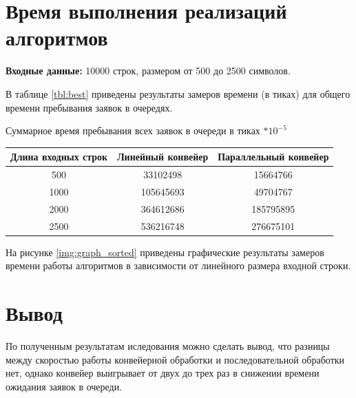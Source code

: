 \section{Время выполнения реализаций алгоритмов}

\textbf{Входные данные:} 10000 строк, размером от 500 до 2500 символов.

В таблице \ref{tbl:best} приведены результаты замеров времени (в тиках) для общего времени пребывания заявок в очередях.

\begin{center}
	\begin{threeparttable}
		\caption{Суммарное время пребывания всех заявок в очереди в тиках $* 10^{-5}$}
		\label{tbl:best}
		\begin{tabular}{|c|c|c|}
			\hline
			Длина входных строк &Линейный конвейер &Параллельный конвейер\\
			\hline
			500 & 33102498& 15664766 \\
			\hline
		    1000& 105645693 &49704767 \\
		    \hline
		    2000&364612686 & 185795895\\
			\hline
		    2500 & 536216748&276675101 \\
			\hline
		\end{tabular}
		
	\end{threeparttable}
\end{center}


 На рисунке \ref{img:graph_sorted} приведены графические результаты замеров времени работы алгоритмов в зависимости от линейного размера входной строки.

\begin{center}
	\label{img:graph_sorted}
\end{center}





\section{Вывод}
По полученным результатам иследования можно сделать вывод, что разницы между скоростью работы конвейерной обработки и последовательной обработки нет, однако конвейер выигрывает от двух до трех раз в снижении времени ожидания заявок в очереди.
